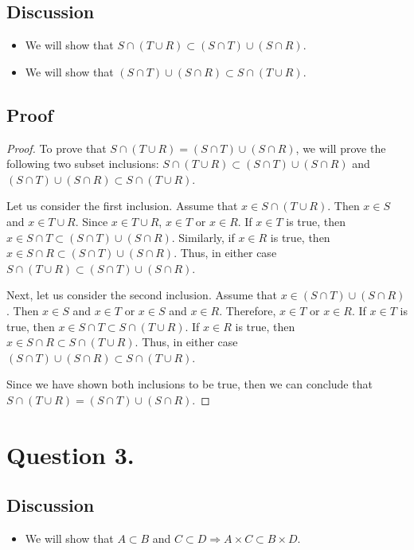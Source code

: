 \documentclass{article}
\begin{document}
\subsection*{Discussion}
\begin{itemize}
    \item We will show that $ S \cap (T \cup R) \subset (S \cap T) \cup (S \cap R) $.
    \item We will show that $ (S \cap T) \cup (S \cap R) \subset S \cap (T \cup R) $.
\end{itemize}

\subsection*{Proof}
\begin{proof}
    To prove that $ S \cap (T \cup R) = (S \cap T) \cup (S \cap R) $, we will prove the following two subset inclusions: $ S \cap (T \cup R) \subset (S \cap T) \cup (S \cap R) $ and $ (S \cap T) \cup (S \cap R) \subset S \cap (T \cup R) $.

    \noindent Let us consider the first inclusion. Assume that $ x \in S \cap (T \cup R) $. Then $ x \in S $ and $ x \in T \cup R $. Since $ x \in T \cup R $, $ x \in T $ or $ x \in R $. If $ x \in T $ is true, then $ x \in S \cap T \subset (S \cap T) \cup (S \cap R) $.
    Similarly, if $ x \in R $ is true, then $ x \in S \cap R \subset (S \cap T) \cup (S \cap R) $. Thus, in either case $ S \cap (T \cup R) \subset (S \cap T) \cup (S \cap R) $.

    \noindent Next, let us consider the second inclusion. Assume that $ x \in (S \cap T) \cup (S \cap R) $. Then $ x \in S $ and $ x \in T $ or $ x \in S $ and $ x \in R $. Therefore, $ x \in T $ or $ x \in R $. If $ x \in T $ is true, then $ x \in S \cap T \subset S \cap (T \cup R) $.
    If $ x \in R $ is true, then $ x \in S \cap R \subset S \cap (T \cup R) $. Thus, in either case $ (S \cap T) \cup (S \cap R) \subset S \cap (T \cup R) $.

    \noindent Since we have shown both inclusions to be true, then we can conclude that $ S \cap (T \cup R) = (S \cap T) \cup (S \cap R) $.
\end{proof}

\section*{Question 3.}
\subsection*{Discussion}
\begin{itemize}
    \item We will show that $ A \subset B $ and $ C \subset D \Rightarrow A \times C \subset B \times D $.
\end{itemize}
\end{document}
